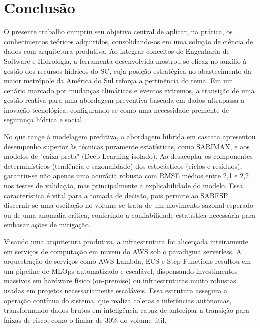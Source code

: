 \chapter{Conclusão}

O presente trabalho cumpriu seu objetivo central de aplicar, na prática, os conhecimentos teóricos adquiridos, consolidando-os em uma solução de ciência de dados com arquitetura produtiva. Ao integrar conceitos de Engenharia de Software e Hidrologia, a ferramenta desenvolvida mostrou-se eficaz no auxílio à gestão dos recursos hídricos do \acrshort{SC}, cuja posição estratégica no abastecimento da maior metrópole da América do Sul reforça a pertinência do tema. Em um cenário marcado por mudanças climáticas e eventos extremos, a transição de uma gestão reativa para uma abordagem preventiva baseada em dados ultrapassa a inovação tecnológica, configurando-se como uma necessidade premente de segurança hídrica e social. 

No que tange à modelagem preditiva, a abordagem híbrida em cascata apresentou desempenho superior às técnicas puramente estatísticas, como \acrshort{SARIMAX}, e aos modelos de "caixa-preta" (Deep Learning isolado). Ao desacoplar os componentes determinísticos (tendência e sazonalidade) dos estocásticos (ciclos e resíduos), garantiu-se não apenas uma acurácia robusta com \acrshort{RMSE} médios entre 2,1 e 2,2 nos testes de validação, mas principalmente a explicabilidade do modelo. Essa característica é vital para a tomada de decisão, pois permite ao \acrshort{SABESP} discernir se uma oscilação no volume se trata de um movimento sazonal esperado ou de uma anomalia crítica, conferindo a confiabilidade estatística necessária para embasar ações de mitigação. 

Visando uma arquitetura produtiva, a infraestrutura foi alicerçada inteiramente em serviços de computação em nuvem do \acrshort{AWS} sob o paradigma serverless. A orquestração de serviços como \acrshort{AWS} Lambda, \acrshort{ECS} e Step Functions resultou em um pipeline de MLOps automatizado e escalável, dispensando investimentos massivos em hardware físico (on-premise) ou infraestruturas muito robustas usadas em projetos necessariamente escaláveis. Essa estrutura assegura a operação contínua do sistema, que realiza coletas e inferências autônomas, transformando dados brutos em inteligência capaz de antecipar a transição para faixas de risco, como o limiar de 30\% do volume útil. 

